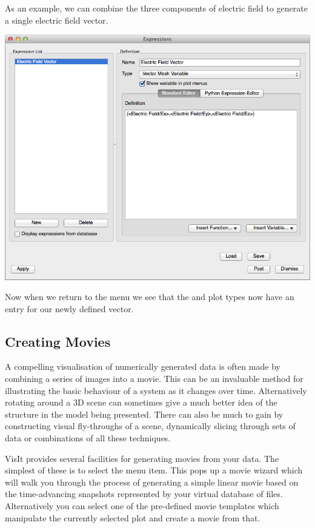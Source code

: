   As an example, we can combine the three components of electric field
  to generate a single electric field vector.
  \begin{center}
    \includegraphics[width=0.8\linewidth]{images/visit_expression_vector}
  \end{center}

  Now when we return to the  menu we see that the 
  and  plot types now have an entry for our newly defined
  vector.

\subsection{Creating Movies}
  A compelling visualisation of numerically generated data is often made
  by combining a series of images into a movie. This can be an invaluable
  method for illustrating the basic behaviour of a system as it changes
  over time. Alternatively rotating around a 3D scene can sometimes
  give a much better idea of the structure in the model being presented. 
  There can also be much to gain by constructing visual fly-throughs
  of a scene, dynamically slicing through sets of data or combinations
  of all these techniques.

  VisIt provides several facilities for generating movies from your
  data. The simplest of these is to select the  menu item. This pops up a movie wizard which will walk
  you through the process of generating a simple linear movie based
  on the time-advancing snapshots represented by your virtual database
  of files. Alternatively you can select one of the pre-defined movie
  templates which manipulate the currently selected plot and create
  a movie from that.

